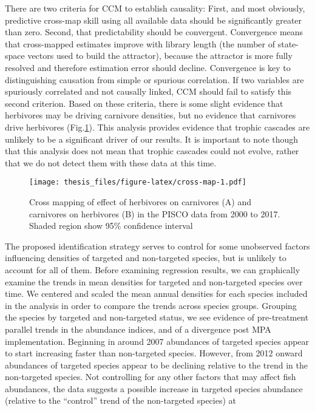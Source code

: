 \documentclass[twoside,12pt,final]{ucthesis-CA2012}
\begin{document}
\begin{ucmainmatter}
There are two criteria for CCM to establish causality: First, and most
obviously, predictive cross-map skill using all available data should be
significantly greater than zero. Second, that predictability should be
convergent. Convergence means that cross-mapped estimates improve with
library length (the number of state-space vectors used to build the
attractor), because the attractor is more fully resolved and therefore
estimation error should decline. Convergence is key to distinguishing
causation from simple or spurious correlation. If two variables are
spuriously correlated and not causally linked, CCM should fail to
satisfy this second criterion. Based on these criteria, there is some
slight evidence that herbivores may be driving carnivore densities, but
no evidence that carnivores drive herbivores (Fig.\ref{fig:cross-map}).
This analysis provides evidence that trophic cascades are unlikely to be
a significant driver of our results. It is important to note though that
this analysis does not mean that trophic cascades could not evolve,
rather that we do not detect them with these data at this time.
\begin{figure}
\centering
\texttt{[image: thesis\_files/figure-latex/cross-map-1.pdf]}
\caption{\label{fig:cross-map}Cross mapping of effect of herbivores on
carnivores (A) and carnivores on herbivores (B) in the PISCO data from
2000 to 2017. Shaded region show 95\% confidence interval}
\end{figure}
The proposed identification strategy serves to control for some
unobserved factors influencing densities of targeted and non-targeted
species, but is unlikely to account for all of them. Before examining
regression results, we can graphically examine the trends in mean
densities for targeted and non-targeted species over time. We centered
and scaled the mean annual densities for each species included in the
analysis in order to compare the trends across species groups. Grouping
the species by targeted and non-targeted status, we see evidence of
pre-treatment parallel trends in the abundance indices, and of a
divergence post MPA implementation. Beginning in around 2007 abundances
of targeted species appear to start increasing faster than non-targeted
species. However, from 2012 onward abundances of targeted species appear
to be declining relative to the trend in the non-targeted species. Not
controlling for any other factors that may affect fish abundances, the
data suggests a possible increase in targeted species abundance
(relative to the ``control'' trend of the non-targeted species) at

\end{ucmainmatter}
\end{document}
